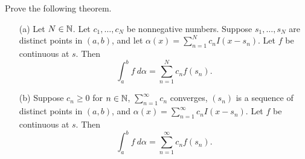 \documentclass[a4paper]{article}
\begin{document}
\begin{problem}
    Prove the following theorem.
\end{problem}
\begin{theorem}
    \begin{enumerate}
        \item[(a)] Let \( N \in \mathbb{N} \). Let \( {c}_{1}, \dots, {c}_{N} \) be nonnegative numbers. Suppose \( {s}_{1}, \dots, {s}_{N} \) are distinct points in \( (a,b) \), and let \( \alpha(x) = \sum_{ n=1  }^{ N } {c}_{n} I(x - {s}_{n}) \). Let \( f  \) be continuous at \( s  \). Then
            \[  \int_{ a }^{ b } f \ d \alpha = \sum_{ n=1  }^{ N  } {c}_{n} f({s}_{n}).  \] 
        \item[(b)] Suppose \( {c}_{n} \geq 0  \) for \( n \in \mathbb{N} \), \( \sum_{ n=1  }^{ \infty  } {c}_{n} \) converges, \( ({s}_{n}) \) is a sequence of distinct points in \( (a,b) \), and \( \alpha(x) = \sum_{ n=1  }^{ \infty  } {c}_{n} I (x - {s}_{n}) \). Let \( f \) be continuous at \( s  \). Then
            \[  \int_{ a }^{ b } f  \ d \alpha = \sum_{ n=1  }^{ \infty  } {c}_{n} f({s}_{n}). \]
    \end{enumerate}
\end{theorem}
\end{document}
